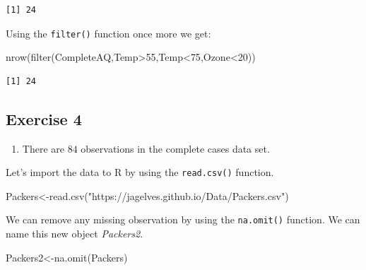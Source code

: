 \documentclass[
  letterpaper,
  DIV=11,
  numbers=noendperiod]{scrreprt}
\newenvironment{Shaded}{\begin{snugshade}}{\end{snugshade}}
\newcommand{\DecValTok}[1]{\textcolor[rgb]{0.68,0.00,0.00}{#1}}
\newcommand{\FunctionTok}[1]{\textcolor[rgb]{0.28,0.35,0.67}{#1}}
\newcommand{\NormalTok}[1]{\textcolor[rgb]{0.00,0.23,0.31}{#1}}
\newcommand{\OtherTok}[1]{\textcolor[rgb]{0.00,0.23,0.31}{#1}}
\newcommand{\SpecialCharTok}[1]{\textcolor[rgb]{0.37,0.37,0.37}{#1}}
\newcommand{\StringTok}[1]{\textcolor[rgb]{0.13,0.47,0.30}{#1}}
\providecommand{\tightlist}{%
  \setlength{\itemsep}{0pt}\setlength{\parskip}{0pt}}\usepackage{longtable,booktabs,array}
\begin{document}
\begin{verbatim}
[1] 24
\end{verbatim}

Using the \texttt{filter()} function once more we get:

\begin{Shaded}
\begin{Highlighting}[numbers=left,,]
\FunctionTok{nrow}\NormalTok{(}\FunctionTok{filter}\NormalTok{(CompleteAQ,Temp}\SpecialCharTok{\textgreater{}}\DecValTok{55}\NormalTok{,Temp}\SpecialCharTok{\textless{}}\DecValTok{75}\NormalTok{,Ozone}\SpecialCharTok{\textless{}}\DecValTok{20}\NormalTok{))}
\end{Highlighting}
\end{Shaded}

\begin{verbatim}
[1] 24
\end{verbatim}

\hypertarget{exercise-4-1}{%
\subsection*{Exercise 4}\label{exercise-4-1}}

\begin{enumerate}
\def\labelenumi{\arabic{enumi}.}
\tightlist
\item
  There are \(84\) observations in the complete cases data set.
\end{enumerate}

Let's import the data to R by using the \texttt{read.csv()} function.

\begin{Shaded}
\begin{Highlighting}[numbers=left,,]
\NormalTok{Packers}\OtherTok{\textless{}{-}}\FunctionTok{read.csv}\NormalTok{(}\StringTok{"https://jagelves.github.io/Data/Packers.csv"}\NormalTok{)}
\end{Highlighting}
\end{Shaded}

We can remove any missing observation by using the \texttt{na.omit()}
function. We can name this new object \emph{Packers2}.

\begin{Shaded}
\begin{Highlighting}[numbers=left,,]
\NormalTok{Packers2}\OtherTok{\textless{}{-}}\FunctionTok{na.omit}\NormalTok{(Packers)}
\end{Highlighting}
\end{Shaded}
\end{document}
